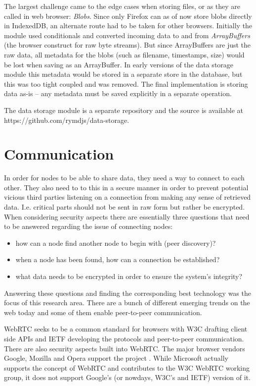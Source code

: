The largest challenge came to the edge cases when storing files, or as they are called in web browser: \emph{Blobs}. Since only Firefox can as of now store blobs directly in IndexedDB, an alternate route had to be taken for other browsers. Initially the module used conditionals and converted incoming data to and from \emph{ArrayBuffers} (the browser construct for raw byte streams). But since ArrayBuffers are just the raw data, all metadata for the blobs (such as filename, timestamps, size) would be lost when saving as an ArrayBuffer. In early versions of the data storage module this metadata would be stored in a separate store in the database, but this was too tight coupled and was removed. The final implementation is storing data as-is – any metadata must be saved explicitly in a separate operation.

The data storage module is a separate repository and the source is available at https://github.com/rymdjs/data-storage.

\section{Communication}

In order for nodes to be able to share data, they need a way to connect to each other. They also need to to this in a secure manner in order to prevent potential vicious third parties listening on a connection from making any sense of retrieved data. I.e. critical parts should not be sent in raw form but rather be encrypted. When considering security aspects there are essentially three questions that need to be answered regarding the issue of connecting nodes:

\begin{itemize}
\item how can a node find another node to begin with (peer discovery)?
\item when a node has been found, how can a connection be established?
\item what data needs to be encrypted in order to ensure the system's integrity?
\end{itemize}

Answering these questions and finding the corresponding best technology was the focus of this research area. There are a bunch of different emerging trends on the web today and some of them enable peer-to-peer communication.

WebRTC seeks to be a common standard for browsers with W3C drafting client side APIs and IETF developing the protocols and peer-to-peer communication\cite{WebRTCWorkingGroupCharter:2013:Online}. There are also security aspects built into WebRTC. The major browser vendors Google, Mozilla and Opera support the project \cite{WebRTCAndMicrosoft:2012:Online}. While Microsoft actually supports the concept of WebRTC and contributes to the W3C WebRTC working group, it does not support Google’s (or nowdays, W3C’s and IETF) version of it\cite{WebRTCAndMicrosoft:2012:Online}.

